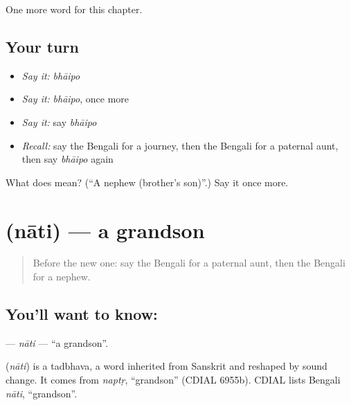 \begin{grammarlens}[title={What you've built}]
One more word for this chapter.
\end{grammarlens}

\subsection*{Your turn}
\begin{itemize}
\raggedright
  \item \emph{Say it:} \emph{bhāipo}
  \item \emph{Say it:} \emph{bhāipo}, once more
  \item \emph{Say it:} say \emph{bhāipo}
  \item \emph{Recall:} say the Bengali for a journey, then the Bengali for a paternal aunt, then say \emph{bhāipo} again
\end{itemize}

\begin{tcolorbox}[breakable,colback=teal!4,colframe=teal!35!black,title={Before you move on}]
What does  mean? (\textquotedblleft{}A nephew (brother's son)\textquotedblright{}.) Say it once more.
\end{tcolorbox}
\section[\texorpdfstring{\bn{নাতি} (nāti)}{নাতি (nāti)}]{ (nāti) — a grandson}

\label{lesson:BN-C252-nati}



\begin{quote}
Before the new one: say the Bengali for a paternal aunt, then the Bengali for a nephew.
\end{quote}

\subsection*{You'll want to know: }
\textbf{} — \emph{nāti} — \textquotedblleft{}a grandson\textquotedblright{}.

\begin{cousinweb}
\textbf{} (\emph{nāti}) is a tadbhava, a word inherited from Sanskrit and reshaped by sound change. It comes from \emph{naptṛ}, \textquotedblleft{}grandson\textquotedblright{} (CDIAL 6955b). CDIAL lists Bengali \emph{nāti}, \textquotedblleft{}grandson\textquotedblright{}.
\end{cousinweb}

